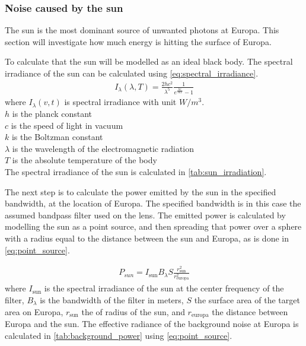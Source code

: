 \subsubsection{Noise caused by the sun}\label{ssec:background_noise}
The sun is the most dominant source of unwanted photons at Europa. This section will investigate how much energy is hitting the surface of Europa. 

To calculate that the sun will be modelled as an ideal black body. The spectral irradiance of the sun can be calculated using \cref{eq:spectral_irradiance}.
\begin{align}\label{eq:spectral_irradiance}
I_\lambda(\lambda,T) = \frac{2hc^2}{\lambda^5}\frac{1}{e^{\frac{hc}{\lambda kT}}-1}
\end{align}
where $I_\lambda(v,t)$ is spectral irradiance with unit $W/m^3$. \\
$h$ is the planck constant\\
$c$ is the speed of light in vacuum \\
$k$ is the Boltzman constant \\
$\lambda$ is the wavelength of the electromagnetic radiation\\
$T$ is the absolute temperature of the body\\



The spectral irradiance of the sun is calculated in \cref{tab:sun_irradiation}.



The next step is to calculate the power emitted by the sun in the specified bandwidth, at the location of Europa. The specified bandwidth is in this case the assumed bandpass filter used on the lens. The emitted power is calculated by modelling the sun as a point source, and then spreading that power over a sphere with a radius equal to the distance between the sun and Europa, as is done in \cref{eq:point_source}.

\begin{align}\label{eq:point_source}
    P_{sun} = I_{\text{sun}} B_\lambda S \frac{r_{\text{sun}}^2}{r_{\text{europa}}^2}
\end{align}
where $I_{\text{sun}}$ is the spectral irradiance of the sun at the center frequency of the filter, $B_\lambda$ is the bandwidth of the filter in meters, $S$ the surface area of the target area on Europa, $r_{\text{sun}}$ the of radius of the sun, and $r_{\text{europa}}$ the distance between Europa and the sun. The effective radiance of the background noise at Europa is calculated in \cref{tab:background_power} using \cref{eq:point_source}.

